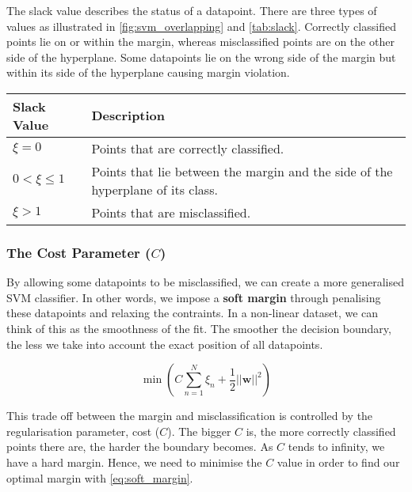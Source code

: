 \documentclass[dissertation.tex]{subfiles}
\begin{document}
The slack value describes the status of a datapoint. There are three types of values as illustrated in \autoref{fig:svm_overlapping} and \autoref{tab:slack}. Correctly classified points lie on or within the margin, whereas misclassified points are on the other side of the hyperplane. Some datapoints lie on the wrong side of the margin but within its side of the hyperplane causing margin violation.

\parbox{\linewidth} {
	\centering
  \begin{tabularx}{\textwidth}{|l|X|}
    \hline
    \textbf{Slack Value}		& \textbf{Description}
    \\ \hline
    $\xi = 0$ 							& Points that are correctly classified.
    \\ \hline
    $0 < \xi \leqslant 1$  	& Points that lie between the margin and the side of the hyperplane of its class.
		\\ \hline
    $\xi > 1$  							& Points that are misclassified.
    \\ \hline

  \end{tabularx}
	\label{tab:slack}
}

\subsubsection{The Cost Parameter ($C$)}
By allowing some datapoints to be misclassified, we can create a more generalised SVM classifier. In other words, we impose a \textbf{soft margin} through penalising these datapoints and relaxing the contraints. In a non-linear dataset, we can think of this as the smoothness of the fit. The smoother the decision boundary, the less we take into account the exact position of all datapoints. 

\begin{equation} \label{eq:soft_margin}
	\min \left ( C \sum_{n=1}^{N} \xi_{n} + \frac{1}{2}||\mathbf{w}||^2 \right )
\end{equation}

This trade off between the margin and misclassification is controlled by the regularisation parameter, cost ($C$). The bigger $C$ is, the more correctly classified points there are, the harder the boundary becomes. As $C$ tends to infinity, we have a hard margin. Hence, we need to minimise the $C$ value in order to find our optimal margin with \autoref{eq:soft_margin}.
\end{document}

